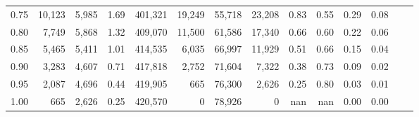 \begin{tabular}{rrrrrrrrrrrrrr}
0.75 &  10,123 &  5,985 &    1.69 &  401,321 &   19,249 &  55,718 &  23,208 &  0.83 &  0.55 &  0.29 &      0.08 \\
0.80 &   7,749 &  5,868 &    1.32 &  409,070 &   11,500 &  61,586 &  17,340 &  0.66 &  0.60 &  0.22 &      0.06 \\
0.85 &   5,465 &  5,411 &    1.01 &  414,535 &    6,035 &  66,997 &  11,929 &  0.51 &  0.66 &  0.15 &      0.04 \\
0.90 &   3,283 &  4,607 &    0.71 &  417,818 &    2,752 &  71,604 &   7,322 &  0.38 &  0.73 &  0.09 &      0.02 \\
0.95 &   2,087 &  4,696 &    0.44 &  419,905 &      665 &  76,300 &   2,626 &  0.25 &  0.80 &  0.03 &      0.01 \\
1.00 &     665 &  2,626 &    0.25 &  420,570 &        0 &  78,926 &       0 &   nan &   nan &  0.00 &      0.00 \\
\bottomrule
\end{tabular}
